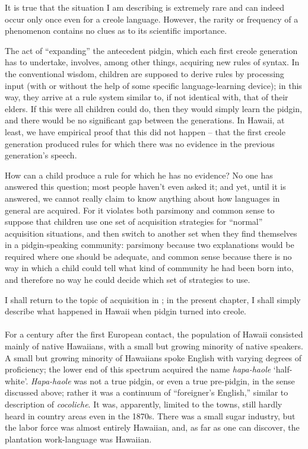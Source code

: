 
It is true that the situation I am describing is extremely rare and can indeed occur only once even for a creole language. However, the rarity or frequency of a phenomenon contains no clues as to its scientific importance.

The act of ``expanding'' the antecedent pidgin, which each first creole generation has to undertake, involves, among other things, acquiring new rules of syntax. In the conventional wisdom, children are supposed to derive rules by processing input (with or without the help of some specific language-learning device);  in this way, they arrive at a rule system similar to, if not identical with, that of their elders. If this were all children could do, then they would simply learn the pidgin, and there would be no significant gap between the generations. In Hawaii, at least, we have empirical proof that this did not happen -- that the first creole generation produced rules for which there was no evidence in the previous generation's speech.

How can a child produce a rule for which he has no evidence? No one has answered this question; most people haven't even asked it; and yet, until it is answered, we cannot really claim to know any\-thing about how languages in general are acquired. For it violates both parsimony and common sense to suppose that children use one set of acquisition strategies for ``normal'' acquisition situations, and then switch to another set when they find themselves in a pidgin-speaking community: parsimony because two explanations would be required where one should be adequate, and common sense because there is no way in which a child could tell what kind of community he had been born into, and therefore no way he could decide which
set of strategies to use.

I shall return to the topic of acquisition in ; in the present chapter, I shall simply describe what happened in Hawaii when pidgin turned into creole.\\\\

For a century after the first European contact, the population of Hawaii consisted mainly of native Hawaiians, with a small but growing minority of native  speakers. A small but growing
minority of Hawaiians spoke English with varying degrees of profi\-ciency; the lower end of this spectrum acquired the name \textit{hapa-haole} `half-white'. \textit{Hapa-haole} was not a true pidgin, or even a true pre-pidgin, in the sense discussed above; rather it was a continuum of ``foreigner's English,'' similar to  description of \textit{cocoliche}. It was, apparently, limited to the towns, still hardly heard in country areas even in the 1870s. There was a small sugar industry, but the labor force was almost entirely Hawaiian, and, as far as one can discover, the plantation work-language was Hawaiian.

